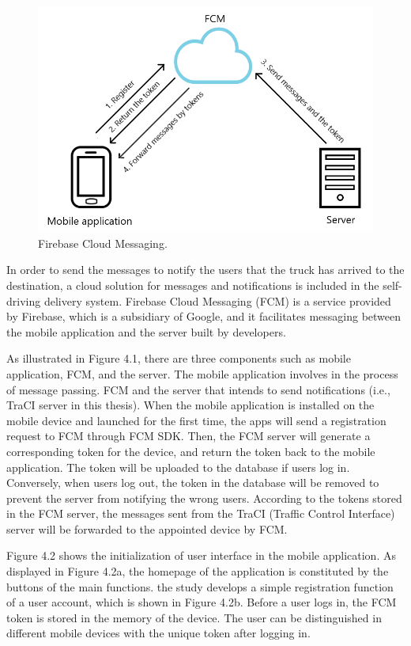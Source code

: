 \documentclass[12pt]{ksthesis}
\begin{document}
\begin{thesis}
{\begin{figure}[H]
\centering
\includegraphics[width=1.0\textwidth]{./figures/F4-1_FCM.PNG}
\caption{\large Firebase Cloud Messaging.}
\vspace{0.5cm}
\label{Fig:FCM}
\end{figure}

In order to send the messages to notify the users that the truck has arrived to the destination, a cloud solution for messages and notifications is included in the self-driving delivery system. Firebase Cloud Messaging (FCM) is a service provided by Firebase, which is a subsidiary of Google, and it facilitates messaging between the mobile application and the server built by developers. 

As illustrated in Figure 4.1, there are three components such as mobile application, FCM, and the server. The mobile application involves in the process of message passing.
FCM and the server that intends to send notifications (i.e., TraCI server in this thesis). 
When the mobile application is installed on the mobile device and launched for the first time, the apps will send a registration request to FCM through FCM SDK. Then, the FCM server will generate a corresponding token for the device, and return the token back to the mobile application. The token will be uploaded to the database if users log in. Conversely, when users log out, the token in the database will be removed to prevent the server from notifying the wrong users. According to the tokens stored in the FCM server, the messages sent from the TraCI (Traffic Control Interface) server will be forwarded to the appointed device by FCM.


Figure 4.2 shows the initialization of user interface in the mobile application. As displayed in Figure 4.2a, the homepage of the application is constituted by the buttons of the main functions. the study develops a simple registration function of a user account, which is shown in Figure 4.2b. 
Before a user logs in, the FCM token is stored in the memory of the device. The user can be distinguished in different mobile devices with the unique token after logging in.
 




}
\end{thesis}
\end{document}
